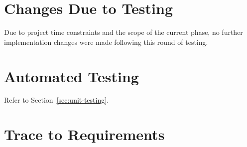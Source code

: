 \documentclass[12pt, titlepage]{article}
\begin{document}
\section{Changes Due to Testing}


Due to project time constraints and the scope of the current phase, no further
implementation changes were made following this round of testing.

\section{Automated Testing}

Refer to Section~\ref{sec:unit-testing}.

\section{Trace to Requirements}
\end{document}
